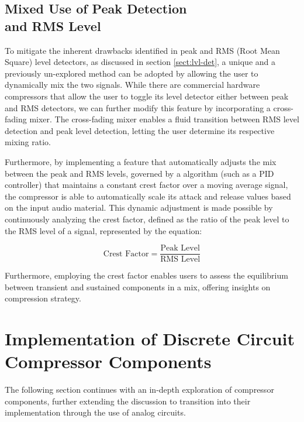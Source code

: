 \documentclass[10pt]{article}
\begin{document}
\begin{multicols*}{2}
            \subsection[Mixed Use of Peak Detection and RMS Level]{Mixed Use of Peak Detection\\and RMS Level} \label{sect:rms-peak-mix}
                To mitigate the inherent drawbacks identified in peak and RMS (Root Mean Square) level detectors, as discussed in section \ref{sect:lvl-det}, a unique and a previously un-explored method can be adopted by allowing the user to dynamically mix the two signals. While there are commercial hardware compressors that allow the user to toggle its level detector either between peak and RMS detectors, we can further modify this feature by incorporating a cross-fading mixer. The cross-fading mixer enables a fluid transition between RMS level detection and peak level detection, letting the user determine its respective mixing ratio.\par
                Furthermore, by implementing a feature that automatically adjusts the mix between the peak and RMS levels, governed by a algorithm (such as a PID controller) that maintains a constant crest factor over a moving average signal, the compressor is able to automatically scale its attack and release values based on the input audio material. This dynamic adjustment is made possible by continuously analyzing the crest factor, defined as the ratio of the peak level to the RMS level of a signal, represented by the equation:

                    \begin{equation}
                        \text{Crest Factor} = \frac{\text{Peak Level}}{\text{RMS Level}}
                    \end{equation}

                \noindent Furthermore, employing the crest factor enables users to assess the equilibrium between transient and sustained components in a mix, offering insights on compression strategy.                
            
        \section{Implementation of Discrete Circuit Compressor Components}
            The following section continues with an in-depth exploration of compressor components, further extending the discussion to transition into their implementation through the use of analog circuits.


\end{multicols*}
\end{document}
